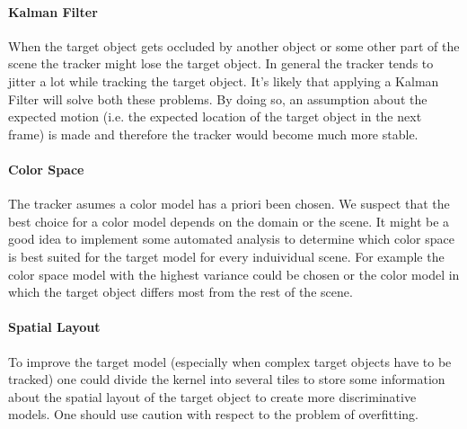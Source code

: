 \documentclass[11pt]{article}
\begin{document}
\paragraph{Kalman Filter} When the target object gets occluded by another object
or some other part of the scene the tracker might lose the target object. In
general the tracker tends to jitter a lot while tracking the target object.
It's likely that applying a Kalman Filter will solve both these problems. By
doing so, an assumption about the expected motion (i.e. the expected location
of the target object in the next frame) is made and therefore the tracker would
become much more stable.

\paragraph{Color Space} The tracker asumes a color model has a priori been
chosen. We suspect that the best choice for a color model depends on the domain
or the scene. It might be a good idea to implement some automated analysis to
determine which color space is best suited for the target model for every
induividual scene. For example the color space model with the highest variance
could be chosen or the color model in which the target object differs most from
the rest of the scene.

\paragraph{Spatial Layout} To improve the target model (especially when complex
target objects have to be tracked) one could divide the kernel into several
tiles to store some information about the spatial layout of the target object
to create more discriminative models. One should use caution with respect to
the problem of overfitting.

\renewcommand\bibname{References}


\end{document}

